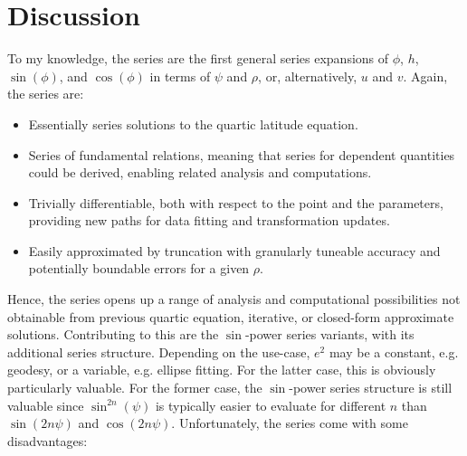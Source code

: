\documentclass[a4paper]{amsart}
\begin{document}
\section{Discussion}
To my knowledge, the series are the first general series expansions of $\phi$, $h$, $\sin(\phi)$, and $\cos(\phi)$ in terms of $\psi$ and $\rho$, or, alternatively, $u$ and $v$. Again, the series are:
\begin{itemize}
\item Essentially series solutions to the quartic latitude equation.%
\item Series of fundamental relations, meaning that series for dependent quantities could be derived, enabling related analysis and computations. %
\item Trivially differentiable, both with respect to the point and the parameters, providing new paths for data fitting and transformation updates.
\item Easily approximated by truncation with granularly tuneable accuracy and potentially boundable errors for a given $\rho$. %
\end{itemize}
Hence, the series opens up a range of analysis and computational possibilities not obtainable from previous quartic equation, iterative, or closed-form approximate solutions.
%
Contributing to this are the $\sin$-power series variants, with its additional series structure. Depending on the use-case, $e^2$ may be a constant, e.g. geodesy, or a variable, e.g. ellipse fitting. %
For the latter case, this is obviously particularly valuable. For the former case, the $\sin$-power series structure is still valuable since $\sin^{2n}(\psi)$ is typically easier to evaluate for different $n$ than $\sin(2n\psi)$ and $\cos(2n\psi)$. %
%
%
Unfortunately, the series come with some disadvantages:
\end{document}
